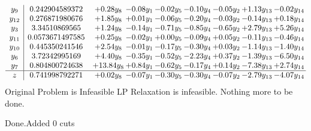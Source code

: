 \documentclass[8pt]{article}
\begin{document}
\[\begin{array}{c| c c@{\hskip 2pt} c@{\hskip 2pt} c@{\hskip 2pt} c@{\hskip 2pt} c@{\hskip 2pt} c@{\hskip 2pt} c@{\hskip 2pt} }
 y_{9}   &  0.242904589372 & +  0.28 y_{8} & -0.08 y_{1} & -0.02 y_{5} & -0.10 y_{4} & -0.05 y_{2} & +  1.13 y_{13} & -0.02 y_{14}\\
 y_{12}   &  0.276871980676 & +  1.85 y_{8} & +  0.01 y_{1} & -0.06 y_{5} & -0.20 y_{4} & -0.03 y_{2} & -0.14 y_{13} & +  0.18 y_{14}\\
 y_{3}   &  3.34510869565 & +  1.24 y_{8} & -0.14 y_{1} & -0.71 y_{5} & -0.85 y_{4} & -0.65 y_{2} & +  2.79 y_{13} & +  5.26 y_{14}\\
 y_{11}   &  0.0573671497585 & +  0.25 y_{8} & -0.02 y_{1} & +  0.00 y_{5} & -0.09 y_{4} & +  0.05 y_{2} & -0.11 y_{13} & -0.46 y_{14}\\
 y_{10}   &  0.445350241546 & +  2.54 y_{8} & -0.01 y_{1} & -0.17 y_{5} & -0.30 y_{4} & +  0.03 y_{2} & -1.14 y_{13} & -1.40 y_{14}\\
 y_{6}   &  3.72342995169 & +  4.40 y_{8} & -0.35 y_{1} & -0.52 y_{5} & -2.23 y_{4} & +  0.37 y_{2} & -1.39 y_{13} & -6.50 y_{14}\\
 y_{7}   &  0.804800724638 & + 13.84 y_{8} & +  0.84 y_{1} & -0.62 y_{5} & -0.17 y_{4} & +  0.14 y_{2} & -7.38 y_{13} & +  2.74 y_{14}\\
\hline
z    &  0.741998792271 & +  0.02 y_{8} & -0.07 y_{1} & -0.30 y_{5} & -0.30 y_{4} & -0.07 y_{2} & -2.79 y_{13} & -4.07 y_{14}\\
\end{array}\]
Original Problem is Infeasible
 LP Relaxation is infeasible. Nothing more to be done. 

Done.Added 0 cuts 
\end{document}
